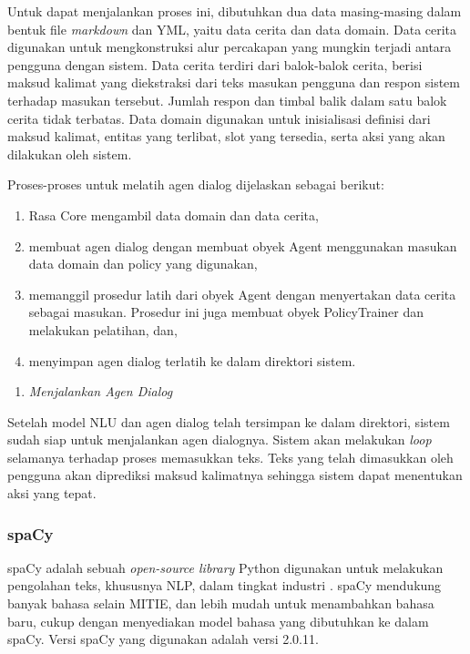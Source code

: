 Untuk dapat menjalankan proses ini, dibutuhkan dua data masing-masing dalam bentuk file \textit{markdown} dan YML, yaitu data cerita dan data domain. Data cerita digunakan untuk mengkonstruksi alur percakapan yang mungkin terjadi antara pengguna dengan sistem. Data cerita terdiri dari balok-balok cerita, berisi maksud kalimat yang diekstraksi dari teks masukan pengguna dan respon sistem terhadap masukan tersebut. Jumlah respon dan timbal balik dalam satu balok cerita tidak terbatas. Data domain digunakan untuk inisialisasi definisi dari maksud kalimat, entitas yang terlibat, slot yang tersedia, serta aksi yang akan dilakukan oleh sistem.

Proses-proses untuk melatih agen dialog dijelaskan sebagai berikut:

\begin{enumerate}
	\item Rasa Core mengambil data domain dan data cerita,
	\item membuat agen dialog dengan membuat obyek Agent menggunakan masukan data domain dan policy yang digunakan,
	\item memanggil prosedur latih dari obyek Agent dengan menyertakan data cerita sebagai masukan. Prosedur ini juga membuat obyek PolicyTrainer dan melakukan pelatihan, dan,
	\item menyimpan agen dialog terlatih ke dalam direktori sistem.
\end{enumerate}

\begin{enumerate}[resume*=rasa_process_list]
	\item \textit{Menjalankan Agen Dialog}
\end{enumerate}

Setelah model NLU dan agen dialog telah tersimpan ke dalam direktori, sistem sudah siap untuk menjalankan agen dialognya. Sistem akan melakukan \textit{loop} selamanya terhadap proses memasukkan teks. Teks yang telah dimasukkan oleh pengguna akan diprediksi maksud kalimatnya sehingga sistem dapat menentukan aksi yang tepat.

\subsubsection{spaCy}

spaCy adalah sebuah \textit{open-source library} Python digunakan untuk melakukan pengolahan teks, khususnya NLP, dalam tingkat industri \parencite{spacy2}. spaCy mendukung banyak bahasa selain MITIE, dan lebih mudah untuk menambahkan bahasa baru, cukup dengan menyediakan model bahasa yang dibutuhkan ke dalam spaCy. Versi spaCy yang digunakan adalah versi 2.0.11.

